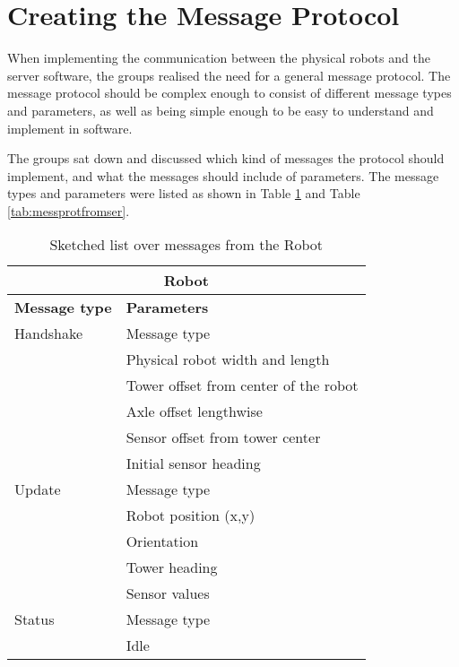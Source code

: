 \section{Creating the Message Protocol}
\label{sec:cremessprot}
When implementing the communication between the physical robots and the server software, the groups realised the need for a general message protocol. The message protocol should be complex enough to consist of different message types and parameters, as well as being simple enough to be easy to understand and implement in software.

The groups sat down and discussed which kind of messages the protocol should implement, and what the messages should include of parameters. The message types and parameters were listed as shown in Table \ref{tab:messprotfromrob} and Table \ref{tab:messprotfromser}.

\begin{table}[ht]
\begin{center}
 \begin{tabular}{|p{60pt} | p{150pt}|}
 \hline
 \multicolumn{2}{|c|}{\textbf{Robot}}\\
 \hline
 \hline
 \textbf{Message type}       &    \textbf{Parameters} \\
 \hline

 Handshake          &   Message type \\
                    &    Physical robot width and length  \\
                    &   Tower offset from center of the robot\\
                    &    Axle offset lengthwise \\
                    &    Sensor offset from tower center \\
                    &    Initial sensor heading \\
 \hline
 Update             &   Message type \\
                    &   Robot position (x,y) \\
                    &   Orientation \\
                    &   Tower heading \\
                    &    Sensor values \\
 \hline
 Status             &   Message type \\
                    &    Idle\\
 \hline
 \end{tabular}
\end{center}
\caption{Sketched list over messages from the Robot}
\label{tab:messprotfromrob}
\end{table}

